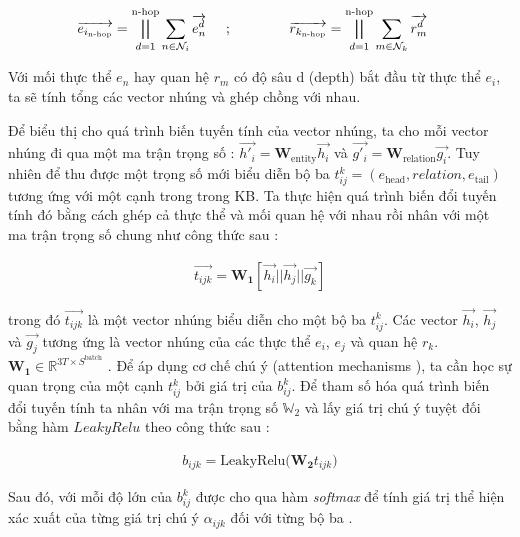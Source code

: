 \begin{align}
{\overrightarrow{e_{i_{\text{n-hop}}}} = \bigparallel_{d=1}^{\text{n-hop}} \sum_{n \in \mathcal{N}_i} \overrightarrow{e_n^d}} \hspace{0.5cm};\hspace{1.5cm}&
{\overrightarrow{r_{k_{\text{n-hop}}}} = \bigparallel_{d=1}^{\text{n-hop}} \sum_{m \in \mathcal{N}_k} \overrightarrow{r_m^d}}
\end{align}

Với mối thực thể $e_n$ hay quan hệ $r_m$ có độ sâu d (depth) bắt đầu từ thực thể $e_i$, ta sẽ tính tổng các vector nhúng và ghép chồng với nhau.

Để biểu thị cho quá trình biến tuyến tính của vector nhúng, ta cho mỗi vector nhúng đi qua một ma trận trọng số : $\overrightarrow{h'_i} = \mathbf{W}_{\text{entity}} \overrightarrow{h_i}$ 
và $\overrightarrow{g'_i} = \mathbf{W}_{\text{relation}} \overrightarrow{g_i}$. Tuy nhiên để thu được một trọng số mới biểu diễn bộ ba $t^k_{ij} = (e_{\text{head}}, relation, e_{\text{tail}})$ tương ứng với một cạnh trong trong KB. Ta thực hiện quá trình biến đổi tuyến tính đó bằng cách ghép cả thực thể và mối quan hệ với nhau rồi nhân với một ma trận trọng số chung như công thức sau :

\begin{align}
\overrightarrow{t_{ijk}} = \mathbf{W_1} [\overrightarrow{h_i} || \overrightarrow{h_j} || \overrightarrow{g_k}]
\end{align}

trong đó $\overrightarrow{t_{ijk}}$ là một vector nhúng biểu diễn cho một bộ ba $t^k_{ij}$. Các vector $\overrightarrow{h_i}$, $\overrightarrow{h_j}$ và $\overrightarrow{g_j}$ tương ứng là vector nhúng của các thực thể $e_i$, $e_j$ và quan hệ $r_k$. $\mathbf{W_1} \in \mathbb{R}^{3 T \times S^\text{batch}}$ . Để áp dụng cơ chế chú ý (attention mechanisms \cite{vaswani2017attention}), ta cần học sự quan trọng của một cạnh $t_{ij}^k$ bởi giá trị của $b_{ij}^k$. Để tham số hóa quá trình biến đổi tuyến tính ta nhân với ma trận trọng số $\mathbb{W}_{2}$ và lấy giá trị chú ý tuyệt đối bằng hàm $LeakyRelu$ theo công thức sau :

\begin{align}
b_{ijk} = \text{LeakyRelu}\Big( \mathbf{W_2} t_{ijk} \Big)
\end{align}

Sau đó, với mỗi độ lớn của $b^k_{ij}$ được cho qua hàm \textit{softmax} để tính giá trị thể hiện xác xuất của từng giá trị chú ý $\alpha_{ijk}$ đối với từng bộ ba .

